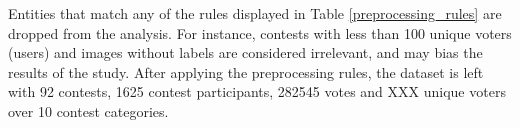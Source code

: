     Entities that match any of the rules displayed in Table \ref{preprocessing_rules} are dropped from the analysis. For instance, contests with less than 100 unique voters (users) and images without labels are considered irrelevant, and may bias the results of the study. After applying the preprocessing rules, the dataset is left with 92 contests, 1625 contest participants, 282545 votes and XXX unique voters over 10 contest categories. %

